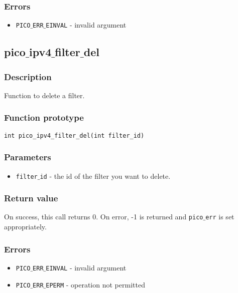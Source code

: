 \subsubsection*{Errors}

\begin{itemize}[noitemsep]
\item \texttt{PICO$\_$ERR$\_$EINVAL} - invalid argument
\end{itemize}


\subsection{pico$\_$ipv4$\_$filter$\_$del}

\subsubsection*{Description}
Function to delete a filter.

\subsubsection*{Function prototype}
\begin{verbatim}
int pico_ipv4_filter_del(int filter_id)
\end{verbatim}

\subsubsection*{Parameters}
\begin{itemize}[noitemsep]
\item \texttt{filter$\_$id} - the id of the filter you want to delete.
\end{itemize}

\subsubsection*{Return value}
On success, this call returns 0.
On error, -1 is returned and \texttt{pico$\_$err} is set appropriately.

\subsubsection*{Errors}

\begin{itemize}[noitemsep]
\item \texttt{PICO$\_$ERR$\_$EINVAL} - invalid argument
\item \texttt{PICO$\_$ERR$\_$EPERM} - operation not permitted
\end{itemize}

